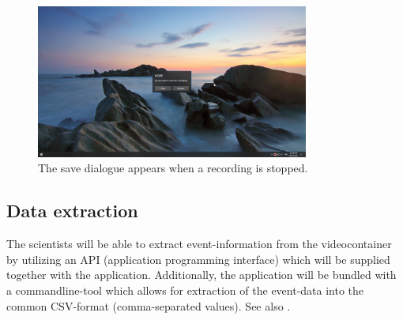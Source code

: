 \begin{figure}[H]
  \includegraphics[width=0.8\textwidth, trim={20cm 10cm 20cm 10cm}, clip]{resources/ui_save_dialogue.png}
  \centering
  \caption{The save dialogue appears when a recording is stopped.}
  \label{fig:sm_ui_saving}
\end{figure}

\subsection{Data extraction}
\label{sec:sm_extraction}
The \glspl{scientist} will be able to extract \gls{event}-information from the videocontainer by utilizing an API (application programming interface) which will be supplied together with the application. Additionally, the application will be bundled with a commandline-tool which allows for extraction of the \gls{event}-data into the common CSV-format (comma-separated values). See also .